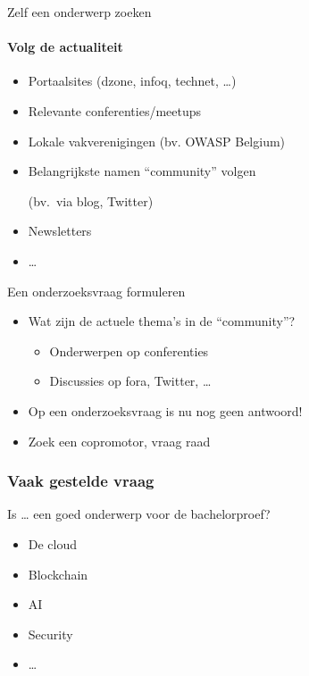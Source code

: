 \documentclass[aspectratio=169]{beamer}
\begin{document}
\begin{frame}{Zelf een onderwerp zoeken}
  \framesubtitle{Volg de actualiteit}

  \begin{itemize}
    \item Portaalsites (dzone, infoq, technet, \ldots)
    \item Relevante conferenties/meetups
    \item Lokale vakverenigingen (bv. OWASP Belgium)
    \item Belangrijkste namen ``community'' volgen

          (bv.\ via blog, Twitter)

    \item Newsletters
    \item \ldots
  \end{itemize}

\end{frame}

\begin{frame}{Een onderzoeksvraag formuleren}

  \begin{itemize}
    \item Wat zijn de actuele thema's in de ``community''?
          \begin{itemize}
            \item Onderwerpen op conferenties
            \item Discussies op fora, Twitter, \ldots
          \end{itemize}
    \item Op een onderzoeksvraag is nu nog geen antwoord!
    \item Zoek een copromotor, vraag raad
  \end{itemize}

\end{frame}

\begin{frame}[plain]
  \frametitle{Vaak gestelde vraag}

  Is \ldots{} een goed onderwerp voor de bachelorproef?

  \begin{itemize}
    \item De cloud
    \item Blockchain
    \item AI
    \item Security
    \item \ldots
  \end{itemize}

  \bigskip

\end{frame}
\end{document}
